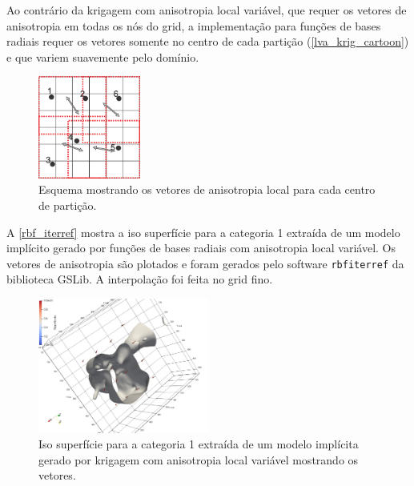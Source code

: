 Ao contrário da krigagem com anisotropia local variável, que requer os vetores de anisotropia em todas os nós do grid, a implementação para funções de bases radiais requer os vetores somente no centro de cada partição (\autoref{lva_krig_cartoon}) e que variem suavemente pelo domínio.

\begin{figure}[H]
\caption{\label{lva_rbf+cartoon} Esquema mostrando os vetores de anisotropia local para cada centro de partição.}
	\begin{center}
		\includegraphics[width=0.3\textwidth]{capitulo_2/lvarbf.jpg}
	\end{center}
\end{figure}

A \autoref{rbf_iterref} mostra a iso superfície para a categoria 1 extraída de um modelo implícito gerado por funções de bases radiais com anisotropia local variável. Os vetores de anisotropia são plotados e foram gerados pelo software \verb|rbfiterref| da biblioteca GSLib. A interpolação foi feita no grid fino.

\begin{figure}[H]
\caption{\label{rbf_iterref}Iso superfície para a categoria 1 extraída de um modelo implícita gerado por krigagem com anisotropia local variável mostrando os vetores.}
	\begin{center}
		\includegraphics[width=0.5\textwidth]{capitulo_2/rbf_iterref.jpeg}
	\end{center}
\end{figure}

